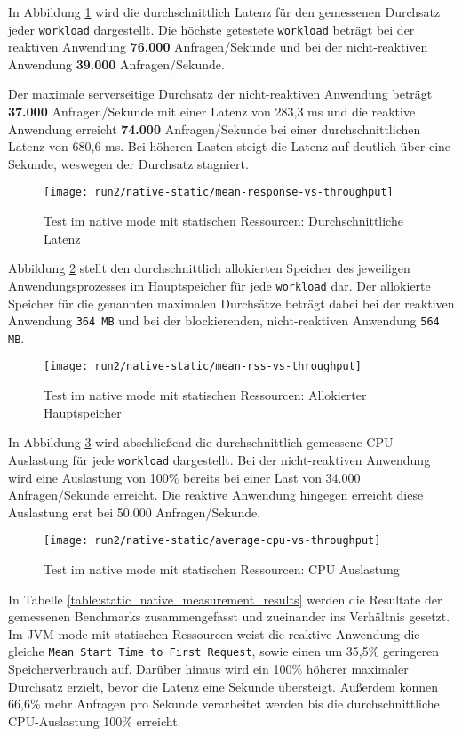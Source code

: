 In Abbildung \ref{fig:native_static_mean_response} wird die durchschnittlich Latenz für den gemessenen Durchsatz jeder \verb|workload| dargestellt.
Die höchste getestete \verb|workload| beträgt bei der reaktiven Anwendung \textbf{76.000} Anfragen/Sekunde und bei der
nicht-reaktiven Anwendung \textbf{39.000} Anfragen/Sekunde.

Der maximale serverseitige Durchsatz der nicht-reaktiven Anwendung beträgt \textbf{37.000} Anfragen/Sekunde mit einer
Latenz von 283,3 ms und
die reaktive Anwendung erreicht \textbf{74.000} Anfragen/Sekunde bei einer durchschnittlichen Latenz von 680,6 ms.
Bei höheren Lasten steigt die Latenz auf deutlich über eine Sekunde, weswegen der Durchsatz stagniert.

\begin{figure}[ht!]
  \centering
  \texttt{[image: run2/native-static/mean-response-vs-throughput]}
  \caption{Test im native mode mit statischen Ressourcen: Durchschnittliche Latenz}
  \label{fig:native_static_mean_response}
\end{figure}
\newpage
Abbildung \ref{fig:native_static_mean_rss} stellt den durchschnittlich allokierten Speicher des jeweiligen Anwendungsprozesses
im Hauptspeicher für jede \verb|workload| dar. Der allokierte Speicher für die genannten maximalen Durchsätze beträgt dabei bei
der reaktiven Anwendung \verb|364 MB| und bei der blockierenden, nicht-reaktiven Anwendung \verb|564 MB|.
\begin{figure}[ht!]
  \centering
  \texttt{[image: run2/native-static/mean-rss-vs-throughput]}
  \caption{Test im native mode mit statischen Ressourcen: Allokierter Hauptspeicher}
  \label{fig:native_static_mean_rss}
\end{figure}

In Abbildung \ref{fig:native_static_avg_cpu} wird abschließend die durchschnittlich gemessene CPU-Auslastung für jede \verb|workload|
dargestellt. Bei der nicht-reaktiven Anwendung wird eine Auslastung von 100\% bereits bei einer Last von
34.000 Anfragen/Sekunde erreicht. Die reaktive Anwendung hingegen erreicht diese Auslastung erst bei 50.000 Anfragen/Sekunde.
\newpage
\begin{figure}[ht!]
  \centering
  \texttt{[image: run2/native-static/average-cpu-vs-throughput]}
  \caption{Test im native mode mit statischen Ressourcen: CPU Auslastung}
  \label{fig:native_static_avg_cpu}
\end{figure}

In Tabelle \ref{table:static_native_measurement_results} werden die Resultate der gemessenen Benchmarks zusammengefasst
und zueinander ins Verhältnis gesetzt. Im JVM mode mit statischen Ressourcen weist die reaktive Anwendung
die gleiche \verb|Mean Start Time to First Request|, sowie
einen um 35,5\% geringeren Speicherverbrauch auf.
Darüber hinaus wird ein 100\% höherer maximaler Durchsatz erzielt, bevor die Latenz eine Sekunde übersteigt.
Außerdem können 66,6\% mehr Anfragen pro Sekunde verarbeitet werden bis die durchschnittliche CPU-Auslastung 100\% erreicht.

